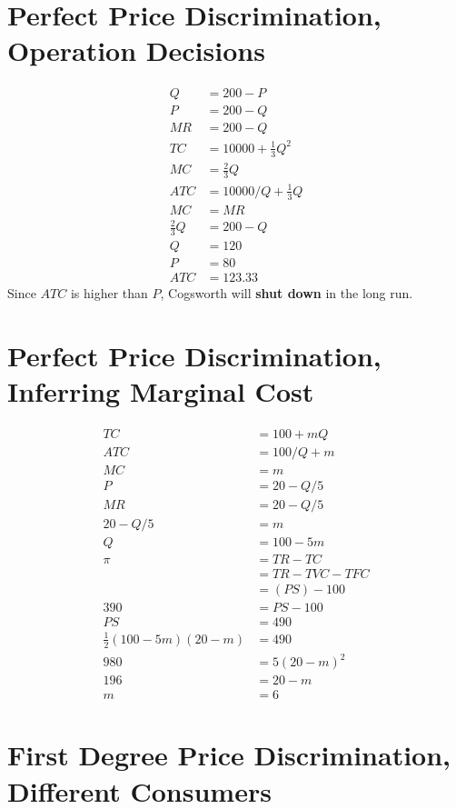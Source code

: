 \documentclass[8pt]{extarticle}
\begin{document}
{\section*{Perfect Price Discrimination, Operation Decisions}
\begin{align*}
	Q &= 200 - P\\
	P &= 200-Q\\
	MR &= 200-Q\\
	TC &= 10000 + \frac{1}{3}Q^2\\
	MC &= \frac{2}{3}Q\\
	ATC &= 10000/Q + \frac{1}{3}Q\\
	MC &= MR\\
	\frac{2}{3}Q &= 200-Q\\
	Q &= 120\\
	P &= 80\\
	ATC &= 123.33
\end{align*}
Since $ATC$ is higher than $P$, Cogsworth will \textbf{shut down} in the long run.
\section*{Perfect Price Discrimination, Inferring Marginal Cost}
\begin{align*}
	TC &= 100 + mQ\\
	ATC &= 100/Q + m\\
	MC &= m\\
  P &= 20-Q/5\\
  MR &= 20-Q/5\\
  20-Q/5 &= m\\
  Q &= 100-5m\\
  \pi &= TR - TC\\
      &= TR - TVC - TFC\\
      &= (PS) - 100\\
  390 &= PS - 100\\
  PS &= 490\\
  \frac{1}{2}(100-5m)(20-m) &= 490\\
  980 &= 5(20-m)^2\\
  196 &= 20-m\\
  m &= 6
\end{align*}
\section*{First Degree Price Discrimination, Different Consumers}
}
\end{document}
